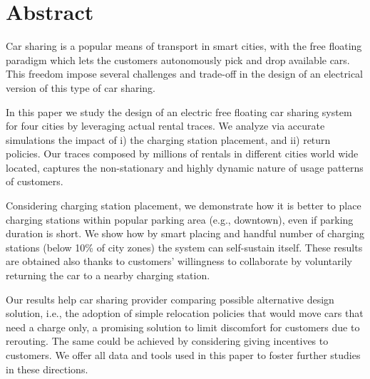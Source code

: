\section{Abstract}

Car sharing is a popular means of transport in smart cities, with the free floating paradigm which lets the customers autonomously pick and drop available cars. This freedom impose several challenges and trade-off in the design of an electrical version of this type of car sharing. 

In this paper we study the design of an electric free floating car sharing system for four cities by leveraging actual rental traces. We analyze via accurate simulations the impact of i) the charging station placement, and ii) return policies.
Our traces composed by millions of rentals in different cities world wide located, captures the non-stationary and highly dynamic nature of usage patterns of customers.

Considering charging station placement, we demonstrate how it is better to place charging stations within popular parking area (e.g., downtown), even if parking duration is short. We show how by smart placing and handful number of charging stations (below 10\% of city zones) the system can self-sustain itself. 
These results are obtained also thanks to customers' willingness to collaborate by voluntarily returning the car to a nearby charging station.

Our results help car sharing provider comparing possible alternative design solution, i.e.,  the adoption of simple relocation policies that would move cars that need a charge only, a promising solution to limit discomfort for customers due to rerouting. The same could be achieved by considering giving incentives to customers. We offer all data and tools used in this paper to foster further studies in these directions.

